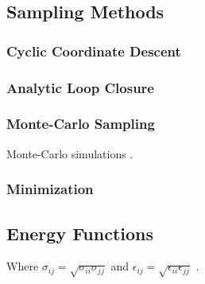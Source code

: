 \subsection{Sampling Methods}
\label{subsection:sampling_methods}

\subsubsection{Cyclic Coordinate Descent}
\label{subsubsection:cyclic_coordinate_descent}

\subsubsection{Analytic Loop Closure}
\label{subsubsection:analytic_loop_closure}

\subsubsection{Monte-Carlo Sampling}
\label{subsubsection:monte_carlo}
Monte-Carlo simulations \cite{li1987monte}.

\subsubsection{Minimization}
\label{subsubsection:minimization}

\subsection{Energy Functions}
\label{subsection:energy_functions}







Where $\sigma_{ij} = \sqrt{\sigma_{ii} \sigma_{jj}}$ and $\epsilon_{ij} = \sqrt{\epsilon_{ii}\epsilon_{jj}}$ \cite{jorgensen1996development}.
